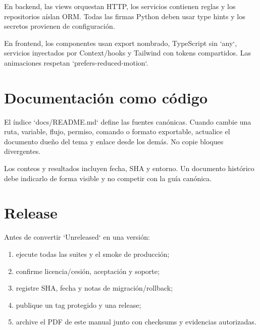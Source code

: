 En backend, las views orquestan HTTP, los servicios contienen reglas y los repositorios aíslan ORM.
Todas las firmas Python deben usar type hints y los secretos provienen de configuración.

En frontend, los componentes usan export nombrado, TypeScript sin `any`, servicios inyectados por
Context/hooks y Tailwind con tokens compartidos. Las animaciones respetan
`prefers-reduced-motion`.

\section{Documentación como código}

El índice `docs/README.md` define las fuentes canónicas. Cuando cambie una ruta, variable, flujo,
permiso, comando o formato exportable, actualice el documento dueño del tema y enlace desde los
demás. No copie bloques divergentes.

Los conteos y resultados incluyen fecha, SHA y entorno. Un documento histórico debe indicarlo de
forma visible y no competir con la guía canónica.

\section{Release}

Antes de convertir `Unreleased` en una versión:

\begin{enumerate}
  \item ejecute todas las suites y el smoke de producción;
  \item confirme licencia/cesión, aceptación y soporte;
  \item registre SHA, fecha y notas de migración/rollback;
  \item publique un tag protegido y una release;
  \item archive el PDF de este manual junto con checksums y evidencias autorizadas.
\end{enumerate}
